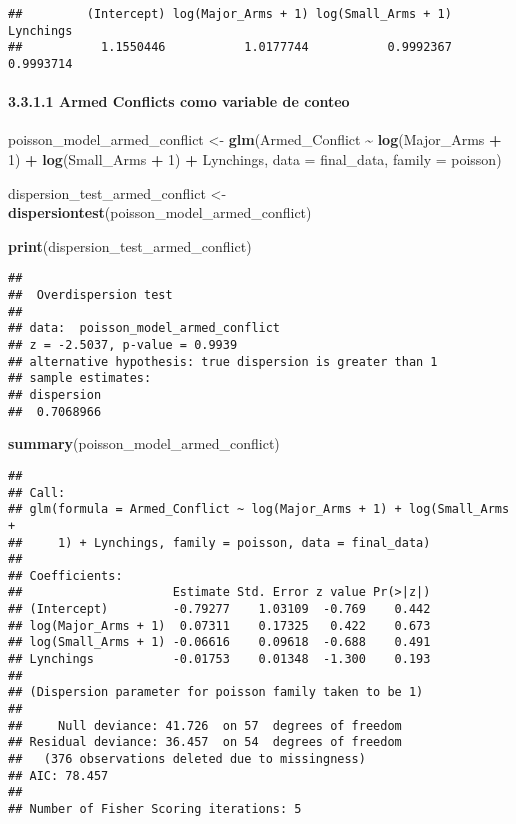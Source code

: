 \documentclass[
  11pt,
]{article}
\newenvironment{Shaded}{\begin{snugshade}}{\end{snugshade}}
\newcommand{\AttributeTok}[1]{\textcolor[rgb]{0.13,0.29,0.53}{#1}}
\newcommand{\DecValTok}[1]{\textcolor[rgb]{0.00,0.00,0.81}{#1}}
\newcommand{\FunctionTok}[1]{\textcolor[rgb]{0.13,0.29,0.53}{\textbf{#1}}}
\newcommand{\NormalTok}[1]{#1}
\newcommand{\OtherTok}[1]{\textcolor[rgb]{0.56,0.35,0.01}{#1}}
\newcommand{\SpecialCharTok}[1]{\textcolor[rgb]{0.81,0.36,0.00}{\textbf{#1}}}
\begin{document}
\begin{verbatim}
##         (Intercept) log(Major_Arms + 1) log(Small_Arms + 1)           Lynchings 
##           1.1550446           1.0177744           0.9992367           0.9993714
\end{verbatim}

\paragraph{3.3.1.1 Armed Conflicts como variable de
conteo}\label{armed-conflicts-como-variable-de-conteo}

\begin{Shaded}
\begin{Highlighting}[]
\NormalTok{poisson\_model\_armed\_conflict }\OtherTok{\textless{}{-}} \FunctionTok{glm}\NormalTok{(Armed\_Conflict }\SpecialCharTok{\textasciitilde{}} \FunctionTok{log}\NormalTok{(Major\_Arms }\SpecialCharTok{+} \DecValTok{1}\NormalTok{) }\SpecialCharTok{+} \FunctionTok{log}\NormalTok{(Small\_Arms }\SpecialCharTok{+} \DecValTok{1}\NormalTok{) }\SpecialCharTok{+}\NormalTok{ Lynchings,                                      }\AttributeTok{data =}\NormalTok{ final\_data, }\AttributeTok{family =}\NormalTok{ poisson)}

\NormalTok{dispersion\_test\_armed\_conflict }\OtherTok{\textless{}{-}} \FunctionTok{dispersiontest}\NormalTok{(poisson\_model\_armed\_conflict)}

\FunctionTok{print}\NormalTok{(dispersion\_test\_armed\_conflict) }
\end{Highlighting}
\end{Shaded}

\begin{verbatim}
## 
##  Overdispersion test
## 
## data:  poisson_model_armed_conflict
## z = -2.5037, p-value = 0.9939
## alternative hypothesis: true dispersion is greater than 1
## sample estimates:
## dispersion 
##  0.7068966
\end{verbatim}

\begin{Shaded}
\begin{Highlighting}[]
\FunctionTok{summary}\NormalTok{(poisson\_model\_armed\_conflict) }
\end{Highlighting}
\end{Shaded}

\begin{verbatim}
## 
## Call:
## glm(formula = Armed_Conflict ~ log(Major_Arms + 1) + log(Small_Arms + 
##     1) + Lynchings, family = poisson, data = final_data)
## 
## Coefficients:
##                     Estimate Std. Error z value Pr(>|z|)
## (Intercept)         -0.79277    1.03109  -0.769    0.442
## log(Major_Arms + 1)  0.07311    0.17325   0.422    0.673
## log(Small_Arms + 1) -0.06616    0.09618  -0.688    0.491
## Lynchings           -0.01753    0.01348  -1.300    0.193
## 
## (Dispersion parameter for poisson family taken to be 1)
## 
##     Null deviance: 41.726  on 57  degrees of freedom
## Residual deviance: 36.457  on 54  degrees of freedom
##   (376 observations deleted due to missingness)
## AIC: 78.457
## 
## Number of Fisher Scoring iterations: 5
\end{verbatim}
\end{document}
